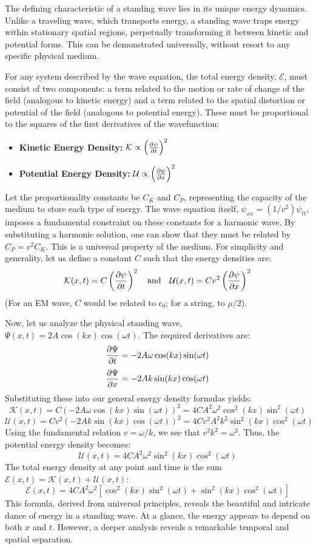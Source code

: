 \begin{proposition}
The defining characteristic of a standing wave lies in its unique energy dynamics. Unlike a traveling wave, which transports energy, a standing wave traps energy within stationary spatial regions, perpetually transforming it between kinetic and potential forms. This can be demonstrated universally, without resort to any specific physical medium.

For any system described by the wave equation, the total energy density, $\mathcal{E}$, must consist of two components: a term related to the motion or rate of change of the field (analogous to kinetic energy) and a term related to the spatial distortion or potential of the field (analogous to potential energy). These must be proportional to the squares of the first derivatives of the wavefunction:
\begin{itemize}
    \item \textbf{Kinetic Energy Density:} $\mathcal{K} \propto \left(\frac{\partial \psi}{\partial t}\right)^2$
    \item \textbf{Potential Energy Density:} $\mathcal{U} \propto \left(\frac{\partial \psi}{\partial x}\right)^2$
\end{itemize}
Let the proportionality constants be $C_K$ and $C_P$, representing the capacity of the medium to store each type of energy. The wave equation itself, $\psi_{xx} = (1/v^2)\psi_{tt}$, imposes a fundamental constraint on these constants for a harmonic wave. By substituting a harmonic solution, one can show that they must be related by $C_P = v^2 C_K$. This is a universal property of the medium. For simplicity and generality, let us define a constant $C$ such that the energy densities are:
$$ \mathcal{K}(x,t) = C\left(\frac{\partial \psi}{\partial t}\right)^2 \quad \text{and} \quad \mathcal{U}(x,t) = C v^2\left(\frac{\partial \psi}{\partial x}\right)^2 $$
(For an EM wave, $C$ would be related to $\epsilon_0$; for a string, to $\mu/2$).

Now, let us analyze the physical standing wave, $\Psi(x, t) = 2A\cos(kx)\cos(\omega t)$.
The required derivatives are:
$$ \frac{\partial \Psi}{\partial t} = -2A\omega \cos(kx)\sin(\omega t) $$
$$ \frac{\partial \Psi}{\partial x} = -2Ak \sin(kx)\cos(\omega t) $$
Substituting these into our general energy density formulas yields:
$$ \mathcal{K}(x,t) = C(-2A\omega \cos(kx)\sin(\omega t))^2 = 4CA^2\omega^2 \cos^2(kx)\sin^2(\omega t) $$
$$ \mathcal{U}(x,t) = C v^2(-2Ak \sin(kx)\cos(\omega t))^2 = 4Cv^2A^2k^2 \sin^2(kx)\cos^2(\omega t) $$
Using the fundamental relation $v = \omega/k$, we see that $v^2k^2 = \omega^2$. Thus, the potential energy density becomes:
$$ \mathcal{U}(x,t) = 4CA^2\omega^2 \sin^2(kx)\cos^2(\omega t) $$
The total energy density at any point and time is the sum $\mathcal{E}(x,t) = \mathcal{K}(x,t) + \mathcal{U}(x,t)$:
$$ \mathcal{E}(x,t) = 4CA^2\omega^2 \left[ \cos^2(kx)\sin^2(\omega t) + \sin^2(kx)\cos^2(\omega t) \right] $$
This formula, derived from universal principles, reveals the beautiful and intricate dance of energy in a standing wave. At a glance, the energy appears to depend on both $x$ and $t$. However, a deeper analysis reveals a remarkable temporal and spatial separation.


\end{proposition}
